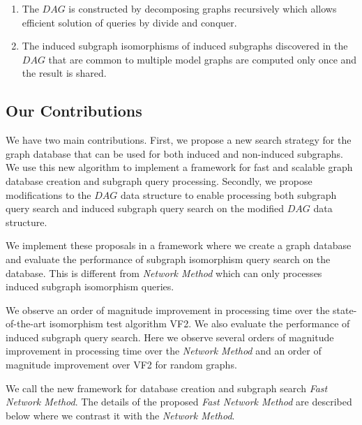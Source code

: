 \begin{enumerate}
\item The $DAG$ is constructed by decomposing graphs recursively which allows efficient solution of queries by divide and conquer.
\item The induced subgraph isomorphisms of induced subgraphs discovered in the $DAG$ that are common to multiple model graphs are computed only once and the result is shared.
\end{enumerate}

\subsection{Our Contributions}
We have two main contributions. 
First, we propose a new search strategy for the graph database that can be used for both induced and non-induced subgraphs. 
We use this new algorithm to implement a framework for fast and scalable graph database creation and subgraph query processing. 
Secondly, we propose modifications to the $DAG$ data structure to enable processing both subgraph query search and induced subgraph query search on the modified $DAG$ data structure. 


We implement these proposals in a framework where we create a graph database and evaluate the performance of subgraph isomorphism query search on the database. 
This is different from \textit{Network Method} which can only processes induced subgraph isomorphism queries. 


We observe an order of magnitude improvement in processing time over the state-of-the-art isomorphism test algorithm VF2.  
We also evaluate the performance of induced subgraph query search. 
Here we observe several orders of magnitude improvement in processing time over the \textit{Network Method} and an order of magnitude improvement over VF2 for random graphs.

We call the new framework for database creation and subgraph search \textit{Fast Network Method}. 
The details of the proposed \textit{Fast Network Method} are described below where we contrast it with the \textit{Network Method}.






